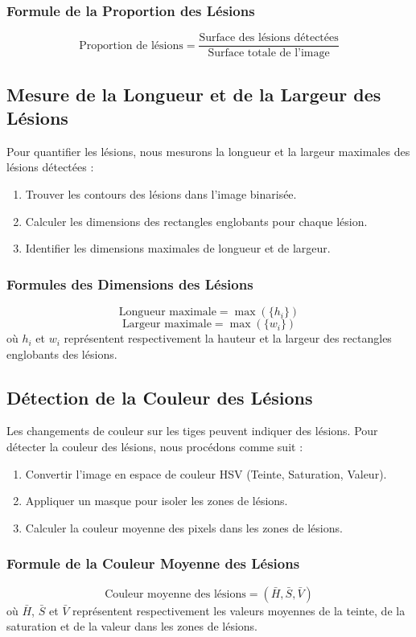 \subsubsection*{Formule de la Proportion des Lésions}
\[
\text{Proportion de lésions} = \frac{\text{Surface des lésions détectées}}{\text{Surface totale de l'image}}
\]

\subsection*{Mesure de la Longueur et de la Largeur des Lésions}

Pour quantifier les lésions, nous mesurons la longueur et la largeur maximales des lésions détectées :
\begin{enumerate}
	\item Trouver les contours des lésions dans l'image binarisée.
	\item Calculer les dimensions des rectangles englobants pour chaque lésion.
	\item Identifier les dimensions maximales de longueur et de largeur.
\end{enumerate}

\subsubsection*{Formules des Dimensions des Lésions}
\[
\text{Longueur maximale} = \max(\{h_i\})
\]
\[
\text{Largeur maximale} = \max(\{w_i\})
\]
où \( h_i \) et \( w_i \) représentent respectivement la hauteur et la largeur des rectangles englobants des lésions.

\subsection*{Détection de la Couleur des Lésions}

Les changements de couleur sur les tiges peuvent indiquer des lésions. Pour détecter la couleur des lésions, nous procédons comme suit :
\begin{enumerate}
	\item Convertir l'image en espace de couleur HSV (Teinte, Saturation, Valeur).
	\item Appliquer un masque pour isoler les zones de lésions.
	\item Calculer la couleur moyenne des pixels dans les zones de lésions.
\end{enumerate}

\subsubsection*{Formule de la Couleur Moyenne des Lésions}
\[
\text{Couleur moyenne des lésions} = \left( \bar{H}, \bar{S}, \bar{V} \right)
\]
où \( \bar{H} \), \( \bar{S} \) et \( \bar{V} \) représentent respectivement les valeurs moyennes de la teinte, de la saturation et de la valeur dans les zones de lésions.

